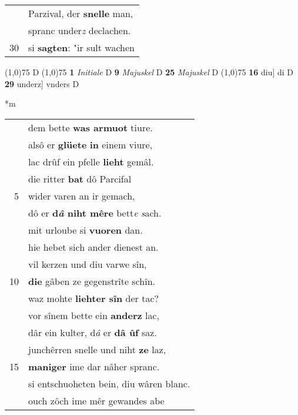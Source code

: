 \documentclass[8pt,a4paper,notitlepage]{article}
\begin{document}
\begin{table}[ht]
\begin{minipage}[t]{0.5\linewidth}
\begin{tabular}{rl}
 & Parzival, der \textbf{snelle} man,\\ 
 & spranc under\textit{z} declachen.\\ 
30 & si \textbf{sagten}: "ir sult wachen\\ 
\end{tabular}
\scriptsize
\line(1,0){75} \newline
D \newline
\line(1,0){75} \newline
\textbf{1} \textit{Initiale} D  \textbf{9} \textit{Majuskel} D  \textbf{25} \textit{Majuskel} D  \newline
\line(1,0){75} \newline
\textbf{16} diu] di D \textbf{29} underz] vnders D \newline
\end{minipage}
\hspace{0.5cm}
\begin{minipage}[t]{0.5\linewidth}
\small
\begin{center}*m
\end{center}
\begin{tabular}{rl}
 & dem bette \textbf{was armuot} tiure.\\ 
 & alsô er \textbf{glüete} \textbf{in} einem viure,\\ 
 & lac drûf ein pfelle \textbf{lieht} gemâl.\\ 
 & die ritter \textbf{bat} dô Parcifal\\ 
5 & wider varen an ir gemach,\\ 
 & dô er \textbf{d\textit{â} niht mêre} bett\textit{e} \textit{s}ach.\\ 
 & mit urloube si \textbf{vuoren} dan.\\ 
 & hie hebet sich ander dienest an.\\ 
 & vil kerzen und diu varwe sîn,\\ 
10 & \textbf{die} gâben ze gegenstrîte schîn.\\ 
 & waz mohte \textbf{liehter sîn} der tac?\\ 
 & vor sînem bette ein \textbf{anderz} lac,\\ 
 & dâr ein kulter, d\textit{â} er \textbf{dâ ûf} saz.\\ 
 & junchêrren snelle und niht \textbf{ze} laz,\\ 
15 & \textbf{maniger} ime dar nâher spranc.\\ 
 & si entschuoheten bein, diu wâren blanc.\\ 
 & ouch zôch ime mêr gewandes abe\\ 

\end{tabular}
\end{minipage}
\end{table}
\end{document}
